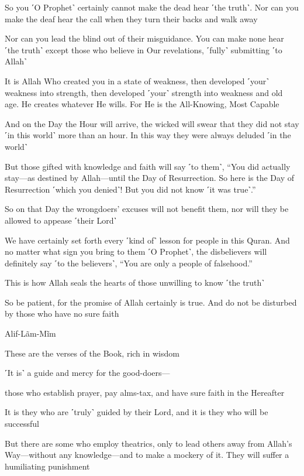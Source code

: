 So you ˹O Prophet˺ certainly cannot make the dead hear ˹the truth˺. Nor can you make the deaf hear the call when they turn their backs and walk away

Nor can you lead the blind out of their misguidance. You can make none hear ˹the truth˺ except those who believe in Our revelations, ˹fully˺ submitting ˹to Allah˺

It is Allah Who created you in a state of weakness, then developed ˹your˺ weakness into strength, then developed ˹your˺ strength into weakness and old age. He creates whatever He wills. For He is the All-Knowing, Most Capable

And on the Day the Hour will arrive, the wicked will swear that they did not stay ˹in this world˺ more than an hour. In this way they were always deluded ˹in the world˺

But those gifted with knowledge and faith will say ˹to them˺, “You did actually stay—as destined by Allah—until the Day of Resurrection. So here is the Day of Resurrection ˹which you denied˺! But you did not know ˹it was true˺.”

So on that Day the wrongdoers’ excuses will not benefit them, nor will they be allowed to appease ˹their Lord˺

We have certainly set forth every ˹kind of˺ lesson for people in this Quran. And no matter what sign you bring to them ˹O Prophet˺, the disbelievers will definitely say ˹to the believers˺, “You are only a people of falsehood.”

This is how Allah seals the hearts of those unwilling to know ˹the truth˺

So be patient, for the promise of Allah certainly is true. And do not be disturbed by those who have no sure faith

Alif-Lãm-Mĩm

These are the verses of the Book, rich in wisdom

˹It is˺ a guide and mercy for the good-doers—

those who establish prayer, pay alms-tax, and have sure faith in the Hereafter

It is they who are ˹truly˺ guided by their Lord, and it is they who will be successful

But there are some who employ theatrics, only to lead others away from Allah’s Way—without any knowledge—and to make a mockery of it. They will suffer a humiliating punishment

